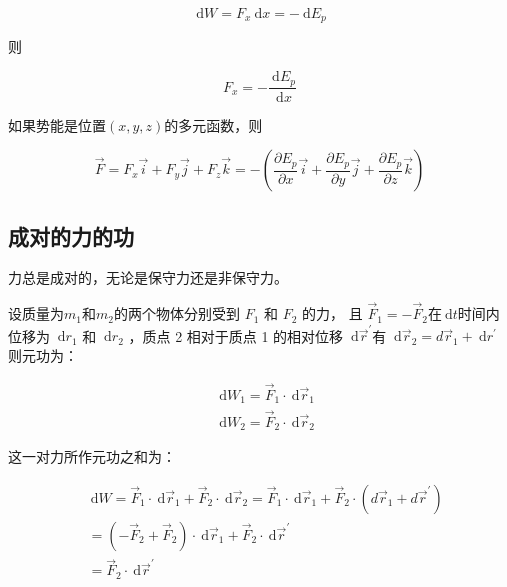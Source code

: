 \documentclass[12pt, a4paper]{article}
\numberwithin{equation}{section}
\newcommand{\rmd}{\mathrm{~d}}
\begin{document}
    $$
        \rmd W=F_x \rmd x=-\rmd E_p
    $$

    则

    \begin{equation}
        F_x=-\frac{\rmd E_p}{\rmd x}
    \end{equation}

    如果势能是位置\(\left(x,y,z\right)\)的多元函数，则

    \begin{equation}
        \overrightarrow{F}=F_x \overrightarrow{i}+F_y \overrightarrow{j}+F_z \overrightarrow{k}=
        -\left(\frac{\partial E_p}{\partial x} \overrightarrow{i}+\frac{\partial E_p}{\partial y} \overrightarrow{j}+\frac{\partial E_p}{\partial z} \overrightarrow{k}\right)
    \end{equation}

\subsection{成对的力的功}

    力总是成对的，无论是保守力还是非保守力。
    
    设质量为$m_1$和$m_2$的两个物体分别受到 $F_1$ 和 $F_2$ 的力，
    且 $\overrightarrow{F}_1=-\overrightarrow{F}_2$在$\rmd t$时间内位移为 $\rmd r_1$
    和 $\rmd r_2$ ，质点 2 相对于质点 1 的相对位移 $\rmd \overrightarrow{r}^{\prime}$有
    $\rmd \overrightarrow{r}_2=d \overrightarrow{r}_1+\rmd r^{\prime}$ 则元功为：
    
    $$
        \begin{aligned}
        & \rmd W_1=\overrightarrow{F}_1 \cdot \rmd \overrightarrow{r}_1 \\
        & \rmd W_2=\overrightarrow{F}_2 \cdot \rmd \overrightarrow{r}_2
        \end{aligned}
    $$

    这一对力所作元功之和为：

    $$
    \begin{aligned}
        & \rmd W=\overrightarrow{F}_1 \cdot \rmd \overrightarrow{r}_1+\overrightarrow{F}_2 \cdot \rmd \overrightarrow{r}_2=\overrightarrow{F}_1 \cdot\rmd\overrightarrow{r}_1+\overrightarrow{F}_2 \cdot\left(d \overrightarrow{r}_1+d \overrightarrow{r}^{\prime}\right) \\
        & =\left(-\overrightarrow{F}_2+\overrightarrow{F}_2\right) \cdot\rmd\overrightarrow{r}_1+\overrightarrow{F}_2 \cdot\rmd\overrightarrow{r}^{\prime} \quad \\
        & =\overrightarrow{F}_2 \cdot\rmd\overrightarrow{r}^{\prime}
    \end{aligned}
    $$
\end{document}
